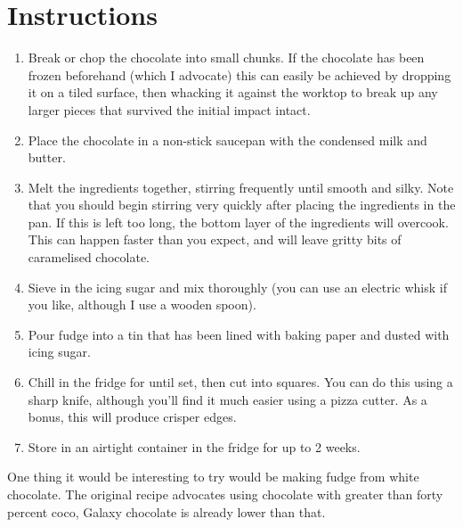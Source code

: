 \documentclass[10pt,a4paper,oneside]{article}
\begin{document}
\section{Instructions}
\begin{enumerate}
\item Break or chop the chocolate into small chunks. If the chocolate has been frozen beforehand (which I advocate) this can easily be achieved by dropping it on a tiled surface, then whacking it against the worktop to break up any larger pieces that survived the initial impact intact.

\item Place the chocolate in a non-stick saucepan with the condensed milk and butter.

\item Melt the ingredients together, stirring frequently until smooth and silky. Note that you should begin stirring very quickly after placing the ingredients in the pan. If this is left too long, the bottom layer of the ingredients will overcook. This can happen faster than you expect, and will leave gritty bits of caramelised chocolate.

\item Sieve in the icing sugar and mix thoroughly (you can use an electric whisk if you like, although I use a wooden spoon).

\item Pour fudge into a tin that has been lined with baking paper and dusted with icing sugar.

\item Chill in the fridge for until set, then cut into squares. You can do this using a sharp knife, although you'll find it much easier using a pizza cutter. As a bonus, this will produce crisper edges.

\item Store in an airtight container in the fridge for up to 2 weeks.
\end{enumerate}

One thing it would be interesting to try would be making fudge from white chocolate. The original recipe advocates using chocolate with greater than forty percent coco, Galaxy chocolate is already lower than that.
\end{document}
